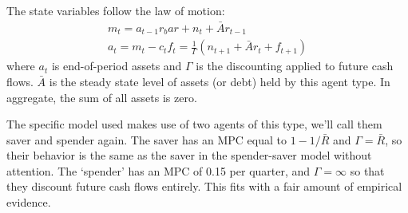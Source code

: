 \documentclass[AER]{AEA}
\begin{document}
The state variables follow the law of motion:
\begin{align}
	m_t = a_{t-1}r_bar + n_t + \bar{A} r_{t-1}\\
	a_t = m_t - c_t
	f_t = \frac{1}{\Gamma} (n_{t+1} +\bar{A}r_t + f_{t+1} ) 
\end{align}
where $a_t$ is end-of-period assets and $\Gamma$ is the discounting applied to future cash flows. $\bar{A}$ is the steady state level of assets (or debt) held by this agent type. In aggregate, the sum of all assets is zero.

The specific model used makes use of two agents of this type, we'll call them saver and spender again. The saver has an MPC equal to $1-1/\bar{R}$ and $\Gamma=\bar{R}$, so their behavior is the same as the saver in the spender-saver model without attention. The `spender' has an MPC of 0.15 per quarter, and $\Gamma=\infty$ so that they discount future cash flows entirely. This fits with a fair amount of empirical evidence.
\end{document}
